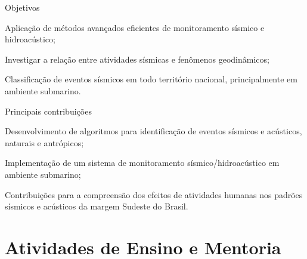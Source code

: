 \documentclass[10pt,a4paper,oneside]{book}
\begin{document}
\begin{fancyenum}{\faFutbol}{Objetivos}
  \item Aplicação de métodos avançados eficientes de monitoramento sísmico e hidroacústico;
  \item Investigar a relação entre atividades sísmicas e fenômenos geodinâmicos;
  \item Classificação de eventos sísmicos em todo território nacional, principalmente em ambiente submarino.
\end{fancyenum}

\begin{fancyenum}{\faCogs}{Principais contribuições}
  \item Desenvolvimento de algoritmos para identificação de eventos sísmicos e acústicos, naturais e antrópicos;
  \item Implementação de um sistema de monitoramento sísmico/hidroacústico em ambiente submarino;
  \item Contribuições para a compreensão dos efeitos de atividades humanas nos padrões sísmicos e acústicos da margem Sudeste do Brasil.
\end{fancyenum}


\chapter{Atividades de Ensino e Mentoria}
\label{cap_ensino}
\end{document}
